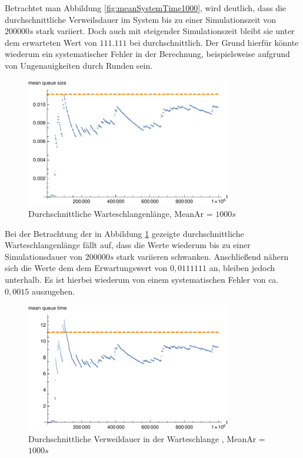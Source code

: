 Betrachtet man Abbildung \ref{fig:meanSystemTime1000}, wird deutlich, dass die durchschnittliche Verweilsdauer im System bis zu einer Simulationszeit von $200000s$ stark variiert. Doch auch mit steigender Simulationszeit bleibt sie unter dem erwarteten Wert von $111.111$ bei durchschnittlich. Der Grund hierfür könnte wiederum ein systematischer Fehler in der Berechnung, beispielsweise aufgrund von Ungenauigkeiten durch Runden sein.

\begin{figure}[htpb]
	\centering
	\includegraphics[width=0.8\textwidth]{abbildungen/1_Phone/Arrival_1000_Serve_100_dur_1000000_Skip_0/MeanQueueSize.pdf}
	\caption{Durchschnittliche Warteschlangenlänge, MeanAr = $1000s$}
	\label{fig:meanQueueSize1000}
\end{figure}

Bei der Betrachtung der in Abbildung \ref{fig:meanQueueSize1000} gezeigte durchschnittliche Warteschlangenlänge fällt auf, dass die Werte wiederum bis zu einer Simulationsdauer von $200000s$ stark variieren schwanken. Anschließend nähern sich die Werte dem dem Erwartungswert von $0,0111111$ an, bleiben jedoch unterhalb. Es ist hierbei wiederum von einem systematischen Fehler von ca. $0,0015$ auszugehen.

\begin{figure}[htpb]
	\centering
	\includegraphics[width=0.8\textwidth]{abbildungen/1_Phone/Arrival_1000_Serve_100_dur_1000000_Skip_0/MeanQueueTime.pdf}
	\caption{Durchschnittliche Verweildauer in der Warteschlange , MeanAr = $1000s$}
	\label{fig:meanQueueTime1000}
\end{figure} 

